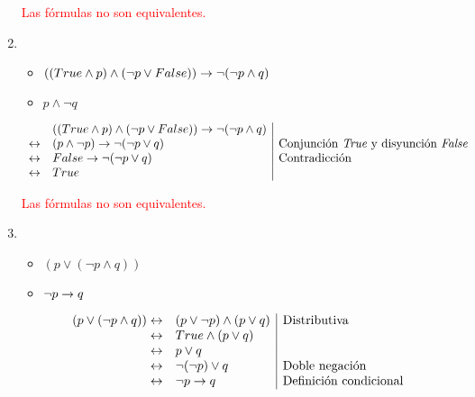 \begin{enumerate}[label=\alph*)]
            \textcolor{red}{Las fórmulas no son equivalentes.}

      \item \begin{itemize}
                  \item $((True \land p) \land (\neg p \lor False)) \rightarrow \neg(\neg p \land q)$
                  \item $p \land \neg q$
            \end{itemize}

            \[
                  \begin{array}{rl|l}
                             & ((True \land p) \land (\neg p \lor False)) \rightarrow \neg(\neg p \land q)                                                               \\
                        \leftrightarrow & (p \land \neg p) \rightarrow \neg (\neg p \lor q)                           & \text{Conjunción \textit{True} y disyunción \textit{False}} \\
                        \leftrightarrow & False \rightarrow \neg (\neg p \lor q)                                      & \text{Contradicción}                                        \\
                        \leftrightarrow & True
                  \end{array}
            \]


            \textcolor{red}{Las fórmulas no son equivalentes.}

      \item \begin{itemize}
                  \item $(p \lor (\neg p \land q))$
                  \item $\neg p \rightarrow q$
            \end{itemize}

            \[
                  \begin{array}{rl|l}
                        (p \lor (\neg p \land q)) \leftrightarrow & (p \lor \neg p) \land (p \lor q) & \text{Distributiva}           \\
                        \leftrightarrow                           & True \land (p \lor q)                                            \\
                        \leftrightarrow                           & p \lor q                                                         \\
                        \leftrightarrow                           & \neg(\neg p) \lor q              & \text{Doble negación}         \\
                        \leftrightarrow                           & \neg p \rightarrow q                   & \text{Definición condicional}
                  \end{array}
            \]


\end{enumerate}
